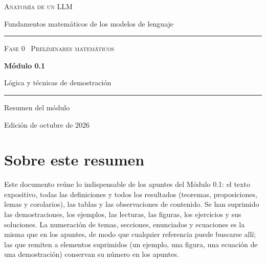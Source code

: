 \documentclass[11pt,a4paper,twoside,openany]{book}
\begin{document}
\frontmatter
\begin{titlepage}
\centering
\vspace*{2.5cm}
{\large\scshape Anatomía de un LLM}\par
\vspace{0.4cm}
{\normalsize Fundamentos matemáticos de los modelos de lenguaje}\par
\vspace{2.2cm}
\rule{\textwidth}{0.8pt}\par\vspace{0.5cm}
{\small\scshape Fase 0 \textperiodcentered\ Preliminares matemáticos}\par\vspace{0.3cm}
{\Huge\bfseries Módulo 0.1\par}\vspace{0.3cm}
{\LARGE Lógica y técnicas de demostración\par}
\vspace{0.5cm}\rule{\textwidth}{0.4pt}\par
\vspace{1.6cm}
{\large Resumen del módulo}\par
\vfill
{\small Edición de octubre de 2026}\par
\end{titlepage}

\chapter*{Sobre este resumen}

Este documento reúne lo indispensable de los apuntes del Módulo 0.1: el texto expositivo, todas las definiciones y todos los resultados (teoremas, proposiciones, lemas y corolarios), las tablas y las observaciones de contenido. Se han suprimido las demostraciones, los ejemplos, las lecturas, las figuras, los ejercicios y sus soluciones. La numeración de temas, secciones, enunciados y ecuaciones es la misma que en los apuntes, de modo que cualquier referencia puede buscarse allí; las que remiten a elementos suprimidos (un ejemplo, una figura, una ecuación de una demostración) conservan su número en los apuntes.
\end{document}
